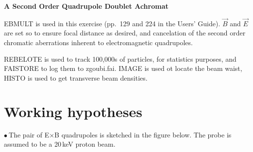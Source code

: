 \documentclass[10pt]{article}
\newcommand{\nib}{\noindent \ensuremath{\bullet~}}
\begin{document}
\thispagestyle{empty}

\begin{minipage}{1.\linewidth}
\bf
\vspace{-2ex}
  
\vspace{-2ex}
  
\vspace{-2ex}
  
\end{minipage}


\vspace{5ex}

\centerline{\LARGE \bf
 A Second Order Quadrupole Doublet Achromat
}


\vspace{5ex}
\author{
F.~M\'eot
\\
Collider-Accelerator Department, BNL, Upton, NY 11973 \\
}



EBMULT is used in this exercise (pp.~129 and 224 in the Users' Guide).  $ \vec B$ and $ \vec E$ are set so to ensure
focal distance as desired, and cancelation of the second order chromatic aberrations inherent to electromagnetic quadrupoles.

REBELOTE is used to track 100,000s of particles, for statistics purposes, and FAISTORE to log them to zgoubi.fai.
IMAGE is used ot locate the beam waist, HISTO is used to get transverse beam densities. 


\section*{Working hypotheses}

\nib The pair of E$\times$B quadrupoles is sketched in the figure below. The probe is assumed to be a 20\,keV proton beam.

~
\end{document}
